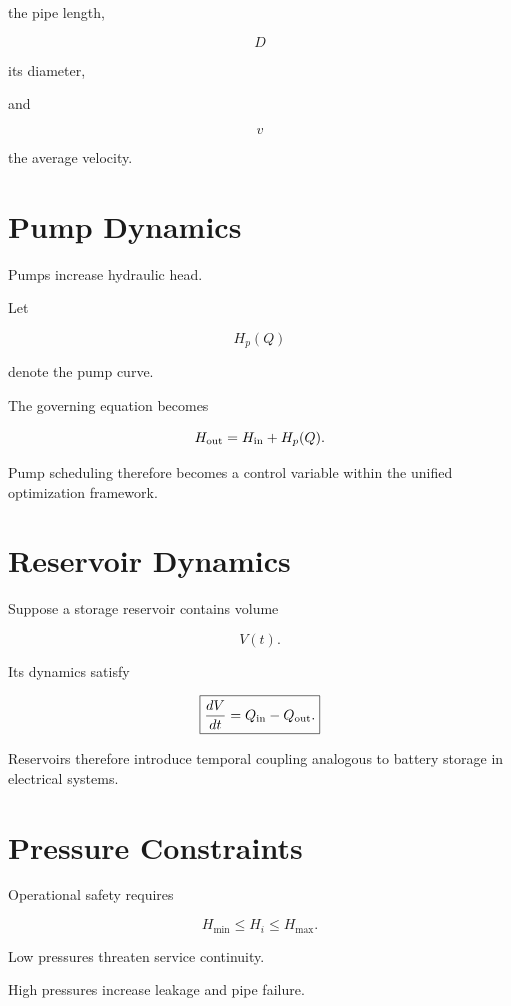 \documentclass[11pt,fleqn]{book}
\numberwithin{equation}{chapter}
\theoremstyle{plain}
\theoremstyle{definition}
\theoremstyle{remark}
\begin{document}
the pipe length,

\[
D
\]

its diameter,

and

\[
v
\]

the average velocity.


\section{Pump Dynamics}

Pumps increase hydraulic head.

Let

\[
H_p(Q)
\]

denote the pump curve.

The governing equation becomes

\[
H_{\rm out}
=
H_{\rm in}
+
H_p(Q).
\]

Pump scheduling therefore becomes a control variable within the unified
optimization framework.


\section{Reservoir Dynamics}

Suppose a storage reservoir contains volume

\[
V(t).
\]

Its dynamics satisfy

\[
\boxed{
\frac{dV}{dt}
=
Q_{\rm in}
-
Q_{\rm out}.
}
\]

Reservoirs therefore introduce temporal coupling analogous to battery
storage in electrical systems.


\section{Pressure Constraints}

Operational safety requires

\[
H_{\min}
\le
H_i
\le
H_{\max}.
\]

Low pressures threaten service continuity.

High pressures increase leakage and pipe failure.
\end{document}
